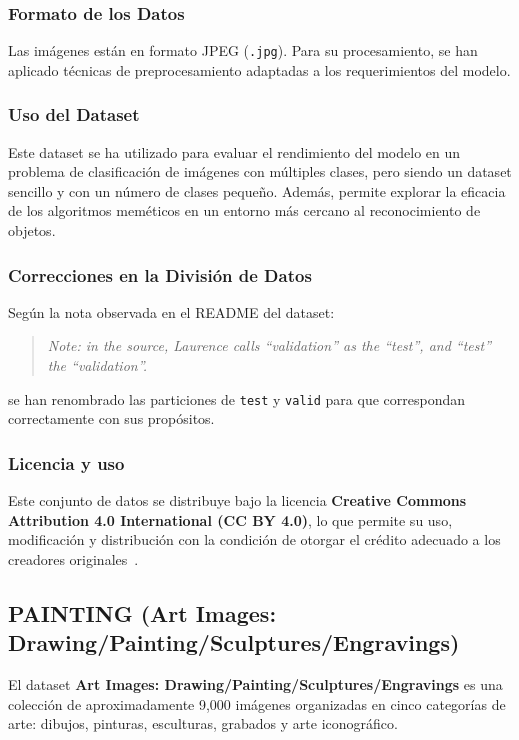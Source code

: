 \subsubsection{Formato de los Datos}
Las imágenes están en formato JPEG (\texttt{.jpg}). Para su procesamiento, se han aplicado técnicas de preprocesamiento
adaptadas a los requerimientos del modelo.

\subsubsection{Uso del Dataset}
Este dataset se ha utilizado para evaluar el rendimiento del modelo en un problema de clasificación de imágenes con
múltiples clases, pero siendo un dataset sencillo y con un número de clases pequeño.
Además, permite explorar la eficacia de los algoritmos meméticos en un entorno más cercano al reconocimiento de objetos.

\subsubsection{Correcciones en la División de Datos}
Según la nota observada en el README del dataset:
\begin{quote}
    \textit{Note: in the source, Laurence calls ``validation'' as the ``test'', and ``test'' the ``validation''.}
\end{quote}
se han renombrado las particiones de \texttt{test} y \texttt{valid} para que correspondan correctamente con sus
propósitos.

\subsubsection{Licencia y uso}
Este conjunto de datos se distribuye bajo la licencia
\textbf{Creative Commons Attribution 4.0 International (CC BY 4.0)}, lo que permite su uso, modificación y distribución
con la condición de otorgar el crédito adecuado a los creadores originales~\cite{moroneyLaurenceMoroneyAI}.


\subsection{PAINTING (Art Images: Drawing/Painting/Sculptures/Engravings)}\label{subsec:painting}
El dataset \textbf{Art Images: Drawing/Painting/Sculptures/Engravings} es una colección de aproximadamente 9,000
imágenes organizadas en cinco categorías de arte: dibujos, pinturas, esculturas, grabados y arte iconográfico.

